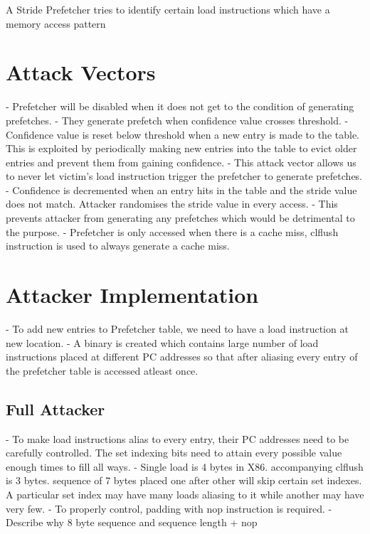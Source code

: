 \documentclass[conference]{IEEEtran}
\begin{document}
A Stride Prefetcher tries to identify certain load instructions which have
a memory access pattern

\section{Attack Vectors}

 - Prefetcher will be disabled when it does not get to the condition
   of generating prefetches.
 - They generate prefetch when confidence value crosses threshold.
 - Confidence value is reset below threshold when a new entry is made to the table.
   This is exploited by periodically making new entries into the table
   to evict older entries and prevent them from gaining confidence.
 - This attack vector allows us to never let victim's load instruction
   trigger the prefetcher to generate prefetches.
 - Confidence is decremented when an entry hits in the table and the stride
   value does not match. Attacker randomises the stride value in every access.
 - This prevents attacker from generating any prefetches
   which would be detrimental to the purpose.
 - Prefetcher is only accessed when there is a cache miss, clflush instruction is
   used to always generate a cache miss.

\section{Attacker Implementation}

 - To add new entries to Prefetcher table, we need to have a load
   instruction at new location.
 - A binary is created which contains large number of
   load instructions placed at different PC addresses so
   that after aliasing every entry of the prefetcher table is
   accessed atleast once.

\subsection{Full Attacker}

 - To make load instructions alias to every entry, their PC addresses
   need to be carefully controlled. The set indexing bits need
   to attain every possible value enough times to fill all ways.
 - Single load is 4 bytes in X86. accompanying clflush is 3 bytes.
   sequence of 7 bytes placed one after other will skip certain
   set indexes. A particular set index may have many loads aliasing
   to it while another may have very few.
 - To properly control, padding with nop instruction is required.
 - Describe why 8 byte sequence and sequence length + nop
\end{document}
